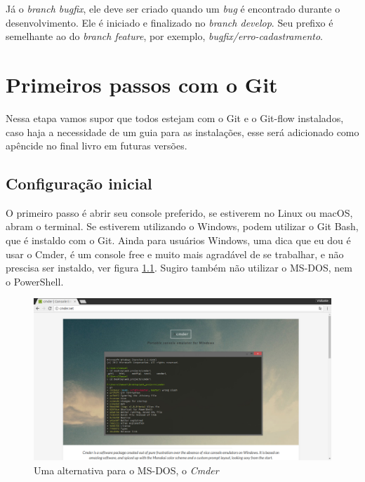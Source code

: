 \documentclass[12pt,openright,oneside,a4paper,english,brazil]{abntex2}
\begin{document}
Já o \textit{branch bugfix}, ele deve ser criado quando um \textit{bug} é encontrado durante o desenvolvimento. Ele é iniciado e finalizado no \textit{branch develop}. Seu prefixo é semelhante ao do \textit{branch feature}, por exemplo, \textit{bugfix/erro-cadastramento}.

\chapter{Primeiros passos com o Git}

Nessa etapa vamos supor que todos estejam com o Git e o Git-flow instalados, caso haja a necessidade de um guia para as instalações, esse será adicionado como apêncide no final livro em futuras versões.

\section{Configuração inicial}

O primeiro passo é abrir seu console preferido, se estiverem no Linux ou macOS, abram o terminal. Se estiverem utilizando o Windows, podem utilizar o Git Bash, que é instaldo com o Git. Ainda para usuários Windows, uma dica que eu dou é usar o Cmder, é um console free e muito mais agradável de se trabalhar, e não prescisa ser instaldo, ver figura \ref{cmder}. Sugiro também não utilizar o MS-DOS, nem o PowerShell.

\begin{figure}[h]
	\caption{\label{cmder}Uma alternativa para o MS-DOS, o \textit{Cmder}}
	\begin{center}
		\includegraphics[width=1\linewidth]{cmder}
	\end{center}
\end{figure}
\end{document}
